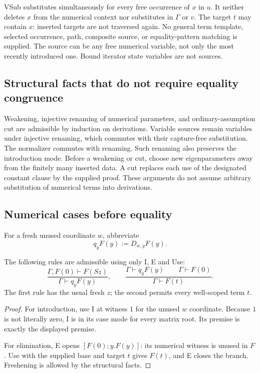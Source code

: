 VSub substitutes simultaneously for every free occurrence of $x$ in
$u$. It neither deletes $x$ from the numerical context nor substitutes
in $\Gamma$ or $v$. The target $t$ may contain $x$: inserted targets
are not traversed again. No general term template, selected occurrence,
path, composite source, or equality-pattern matching is supplied.
The source can be any free numerical variable, not only the most
recently introduced one. Bound iterator state variables are not sources.

\subsection{Structural facts that do not require equality congruence}

Weakening, injective renaming of numerical parameters, and
ordinary-assumption cut are admissible by induction on derivations.
Variable sources remain variables under injective renaming, which
commutes with their capture-free substitution. The normalizer commutes
with renaming. Such renaming also preserves the introduction mode.
Before a weakening or cut, choose new eigenparameters away from the
finitely many inserted data. A cut replaces each use of the designated
constant clause by the supplied proof. These arguments do not assume
arbitrary substitution of numerical terms into derivations.

\subsection{Numerical cases before equality}

For a fresh unused coordinate $w$, abbreviate
\[
       q_yF(y):=D_{w,y}F(y).
\]

\begin{lemma}
The following rules are admissible using only I, E and Use:
\[
 \frac{\Gamma,F(0)\vdash F(Sz)}{\Gamma\vdash q_yF(y)},
 \qquad
 \frac{\Gamma\vdash q_yF(y)\qquad\Gamma\vdash F(0)}
      {\Gamma\vdash F(t)}.
\]
The first rule has the usual fresh $z$; the second permits every
well-scoped term $t$.
\end{lemma}
\begin{proof}
For introduction, use I at witness $1$ for the unused $w$ coordinate.
Because $1$ is not literally zero, I is in its case mode for every
matrix root. Its premise is exactly the displayed premise.

For elimination, E opens $[F(0);y.F(y)]$: its numerical witness is
unused in $F$. Use with the supplied base and target $t$ gives $F(t)$,
and E closes the branch. Freshening is allowed by the structural facts.
\end{proof}

